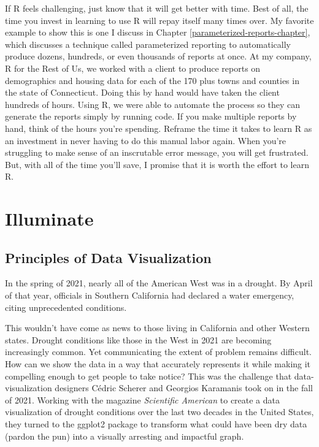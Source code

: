 \documentclass[
]{book}
\begin{document}
If R feels challenging, just know that it will get better with time. Best of all, the time you invest in learning to use R will repay itself many times over. My favorite example to show this is one I discuss in Chapter \ref{parameterized-reports-chapter}, which discusses a technique called parameterized reporting to automatically produce dozens, hundreds, or even thousands of reports at once. At my company, R for the Rest of Us, we worked with a client to produce reports on demographics and housing data for each of the 170 plus towns and counties in the state of Connecticut. Doing this by hand would have taken the client hundreds of hours. Using R, we were able to automate the process so they can generate the reports simply by running code. If you make multiple reports by hand, think of the hours you're spending. Reframe the time it takes to learn R as an investment in never having to do this manual labor again. When you're struggling to make sense of an inscrutable error message, you will get frustrated. But, with all of the time you'll save, I promise that it is worth the effort to learn R.

\hypertarget{part-illuminate}{%
\part*{Illuminate}\label{part-illuminate}}

\hypertarget{data-viz-chapter}{%
\chapter{Principles of Data Visualization}\label{data-viz-chapter}}

In the spring of 2021, nearly all of the American West was in a drought. By April of that year, officials in Southern California had declared a water emergency, citing unprecedented conditions.

This wouldn't have come as news to those living in California and other Western states. Drought conditions like those in the West in 2021 are becoming increasingly common. Yet communicating the extent of problem remains difficult. How can we show the data in a way that accurately represents it while making it compelling enough to get people to take notice?
This was the challenge that data-visualization designers Cédric Scherer and Georgios Karamanis took on in the fall of 2021. Working with the magazine \emph{Scientific American} to create a data visualization of drought conditions over the last two decades in the United States, they turned to the ggplot2 package to transform what could have been dry data (pardon the pun) into a visually arresting and impactful graph.
\end{document}
